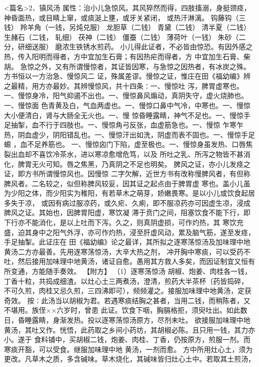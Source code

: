 \documentclass[a4paper,12pt,UTF8,twoside]{ctexbook}
\begin{document}
<篇名>2．镇风汤
属性：治小儿急惊风。其风猝然而得，四肢搐溺，身挺颈痉，神昏面热，或目睛上窜，或痰涎上壅，或牙关紧闭， 
或热汗淋漓。 
钩藤钩（三钱） 羚羊角（一钱，另炖兑服） 龙胆草（二钱） 青黛（二钱） 清半夏（二钱） 生赭石（二钱， 
轧细） 茯神（二钱） 僵蚕（二钱） 薄荷叶（一钱） 朱砂（二分，研细送服） 
磨浓生铁锈水煎药。 
小儿得此证者，不必皆由惊恐。有因外感之热，传入阳明而得者，方中宜加生石膏；有因热疟而得者，方 
中宜加生石膏、柴胡。 
急惊之外，又有所谓慢惊者，其证皆因寒，与急惊之因热者，有冰炭之殊。方书恒以一方治急、慢惊风二 
证，殊属差谬。慢惊之证，惟庄在田《福幼编》辨之最精，用方亦最妙。其辨慢惊风，共十四条∶一、慢惊吐 
泻，脾胃虚寒也。一、慢惊身冷，阳气抑遏不出也。一、慢惊鼻风煽动，真阴失守，虚火烧肺也。一、慢惊面 
色青黄及白，气血两虚也。一、慢惊口鼻中气冷，中寒也。一、慢惊大小便清白，肾与大肠全无火也。一、慢 
惊昏睡露睛，神气不足也。一、慢惊手足抽掣，血不行于四肢也。一、慢惊角弓反张，血虚筋急也。一、慢惊 
乍寒乍热，阴血虚少，阴阳错乱也。一、慢惊汗出如洗，阴虚而表不固也。一、慢惊手足螈 ，血不足养筋也。 
一、慢惊囟门下陷，虚至极也。一、慢惊身虽发热、口唇焦裂出血却不喜饮冷茶水，进以寒凉愈增危笃，以及 
所吐之乳、所泻之物皆不甚消化，脾胃无火可知。唇之焦黑，乃真阴之不足也明矣。 
脾风之证，亦小儿发痉之证，即方书所谓慢惊风也。因慢惊 
二字欠解，近世方书有改称慢脾风者，有但称脾风者。二名较之，似但称脾风较妥，因其证之起点由于脾胃虚 
寒也。盖小儿虽为少阳之体，而少阳实为稚阳，有若草木之萌芽，娇嫩畏寒。是以小儿或饮食起居多失于凉， 
或因有病过服凉药，或久疟、久痢，即不服凉药亦可因虚生凉，浸成脾风之证。其始也，因脾胃阳虚，寒饮凝 
滞于贲门之间，阻塞饮食不能下行，即下行亦不能消化，是以上吐而下泻。久之，则真阴虚损，可作灼热，其 
寒饮充盛，迫其身中之阳气外浮，亦可作灼热，浸至肝虚风动，累及脑气筋，遂至发痉，手足抽掣。此证庄在 
田《福幼编》论之最详，其所拟之逐寒荡惊汤及加味理中地黄汤二方亦最善。先用逐寒荡惊汤，大辛大热之剂， 
冲开胸中寒痰，可以受药不吐，然后接用加味理中地黄汤，诸证自愈。愚用其方救人多矣，而因证制宜又恒有 
所变通，方能随手奏效。 
【附方】 
（1）逐寒荡惊汤 
胡椒、炮姜、肉桂各一钱，丁香十粒，共捣成细渣。以灶心土三两煮汤，澄清，煎药大半茶杯（药皆捣碎， 
不可久煎，肉桂又忌久煎，三四沸即可），频频灌之。接服加味理中地黄汤，定获奇效。 
按∶此汤当以胡椒为君。若遇寒痰结胸之甚者，当用二钱，而稍陈者，又不堪用。族侄××六岁时，曾患 
此证。饮食下咽，胸膈格拒，须臾吐出。如此数日，昏睡露睛，身渐发热。投以逐寒荡惊汤原方，尽剂未吐。 
欲接服加味理中地黄汤，其吐又作。恍悟，此药取之乡间小药坊，其胡椒必陈。且只用一钱，其力亦小。遂于 
食料铺中，买胡椒二钱，炮姜、肉桂、丁香，仍按原方，煎服一剂。而寒痰开豁，可以受食。继服加味理中地 
黄汤，一剂而愈。 
方中所用灶心土，须为更改。凡草木之质，多含碱味。草木烧化，其碱味皆归灶心土中。若取其土煎汤， 
\end{document}
